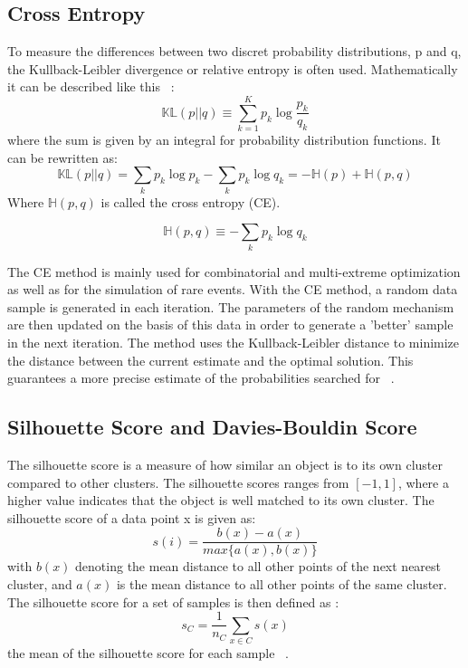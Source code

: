 \subsection{Cross Entropy}

To measure the differences between two discret probability distributions, p and q, the Kullback-Leibler divergence or relative entropy is often used. 
Mathematically it can be described like this ~\cite{murphy2013machine}: 
\begin{equation}
    \mathbb{KL}(p||q) \equiv \sum_{k=1}^{K} p_k \log \frac{p_k}{q_k}
\end{equation}
where the sum is given by an integral for probability distribution functions. It can be rewritten as:
\begin{equation}
   \mathbb{KL}(p||q) = \sum_k p_k \log p_k - \sum_k p_k \log q_k = -\mathbb{H}(p) + \mathbb{H}(p, q)
\end{equation}
Where $\mathbb{H}(p, q)$ is called the cross entropy (CE).

\begin{equation}
    \mathbb{H}(p, q) \equiv -\sum_k p_k \log q_k
\end{equation}

The CE method is mainly used for combinatorial and multi-extreme optimization as well as for the simulation of rare events. 
With the CE method, a random data sample is generated in each iteration. The parameters of the random mechanism are then updated on the basis of this data in order to generate a 'better' sample in the next iteration. The method uses the Kullback-Leibler distance to minimize the distance between the current estimate and the optimal solution.
This guarantees a more precise estimate of the probabilities searched for ~\cite{crossentropy1}.

\subsection{Silhouette Score and Davies-Bouldin Score}

The silhouette score is a measure of how similar an object is to its own cluster compared to other clusters. The silhouette scores ranges from $[-1 ,1]$, where a higher value indicates that the object is well matched to its own cluster. The silhouette score of a data point x is given as:
\begin{equation}
     s(i) = \frac{b(x) - a(x)}{max\{a(x),b(x)\}}
\end{equation}
with $b(x)$ denoting the mean distance to all other points of the next nearest cluster, and $a(x)$ is the mean distance to all other points of the same cluster. 
The silhouette score for a set of samples is then defined as :
\begin{equation}
    s_C = \frac{1}{n_C} \sum_{x \in C} s(x)
\end{equation}
the mean of the silhouette score for each sample ~\cite{SilhotteCoefficient}.

